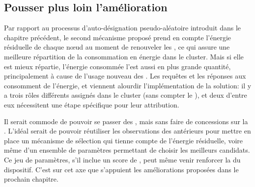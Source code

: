     \subsection{Pousser plus loin l'amélioration}

Par rapport au processus d'auto-désignation pseudo-aléatoire introduit dans le chapitre précédent, le second mécanisme proposé prend en compte l'énergie résiduelle de chaque nœud au moment de renouveler les \cns, ce qui assure une meilleure répartition de la consommation en énergie dans le cluster.
Mais si elle est mieux répartie, l'énergie consommée l'est aussi en plus grande quantité, principalement à cause de l'usage nouveau des \vns.
Les requêtes et les réponses aux \cns consomment de l'énergie, et viennent alourdir l'implémentation de la solution: il y a trois rôles différents assignés dans le cluster (sans compter le \ch), et deux d'entre eux nécessitent une étape spécifique pour leur attribution.

Il serait commode de pouvoir se passer des \vns, mais sans faire de concessions sur la \secu.
L'idéal serait de pouvoir réutiliser les observations des \cns antérieurs pour mettre en place un mécanisme de sélection qui tienne compte de l'énergie résiduelle, voire même d'un ensemble de paramètres permettant de choisir les meilleurs candidats.
Ce jeu de paramètres, s'il inclue un score de , peut même venir renforcer la \secu du dispositif.
C'est sur cet axe que s'appuient les améliorations proposées dans le prochain chapitre.
